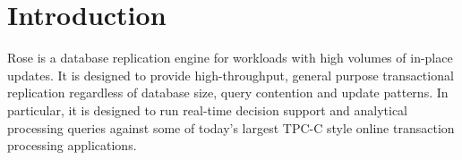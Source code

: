 \documentclass{vldb}
\newcommand{\rows}{Rose\xspace}
\newcommand{\rowss}{Rose's\xspace}
\begin{document}
\begin{abstract}
\rows avoids random I/O during replication and scans, leaving more
I/O capacity for queries than existing systems, and providing
scalable, real-time replication of seek-bound workloads.
Analytical models and experiments show that \rows provides orders of
magnitude greater replication bandwidth over larger databases than conventional
techniques.





\end{abstract}





\section{Introduction}

\rows is a database replication engine for workloads with high volumes
of in-place updates.  It is designed to provide high-throughput,
general purpose transactional replication regardless of
database size, query contention and update patterns.  In particular, it
is designed to run real-time decision support and analytical
processing queries against some of today's largest TPC-C style online
transaction processing applications.
\end{document}
